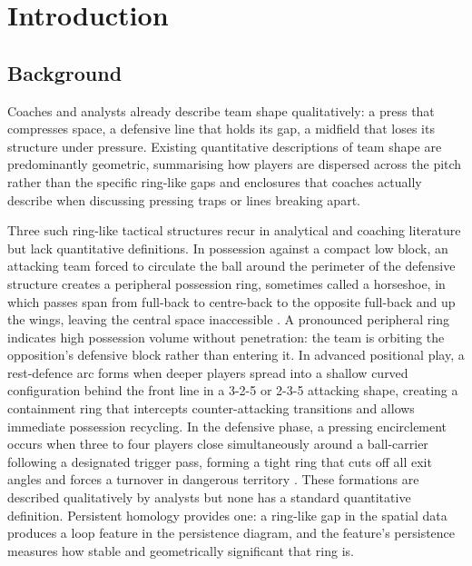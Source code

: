\section{Introduction}

\subsection{Background}
\label{sec:intro}

Coaches and analysts already describe team shape qualitatively: a press
that compresses space, a defensive line that holds its gap, a midfield
that loses its structure under pressure. Existing quantitative
descriptions of team shape are predominantly geometric, summarising how
players are dispersed across the pitch rather than the specific
ring-like gaps and enclosures that coaches actually describe when
discussing pressing traps or lines breaking apart.

Three such ring-like tactical structures recur in analytical and
coaching literature but lack quantitative definitions. In possession
against a compact low block, an attacking team forced to circulate the
ball around the perimeter of the defensive structure creates a
peripheral possession ring, sometimes called a horseshoe, in which
passes span from full-back to centre-back to the opposite full-back
and up the wings, leaving the central space inaccessible \cite{decroos2019}.
A pronounced peripheral ring indicates high possession volume without
penetration: the team is orbiting the opposition's defensive block
rather than entering it. In advanced positional play, a rest-defence
arc forms when deeper players spread into a shallow curved
configuration behind the front line in a 3-2-5 or 2-3-5 attacking
shape, creating a containment ring that intercepts counter-attacking
transitions and allows immediate possession recycling. In the
defensive phase, a pressing encirclement occurs when three to four
players close simultaneously around a ball-carrier following a
designated trigger pass, forming a tight ring that cuts off all exit
angles and forces a turnover in dangerous territory \cite{andrienko2017}.
These formations are described qualitatively by analysts but none has
a standard quantitative definition. Persistent homology provides one:
a ring-like gap in the spatial data produces a loop feature in the
persistence diagram, and the feature's persistence measures how stable
and geometrically significant that ring is.

